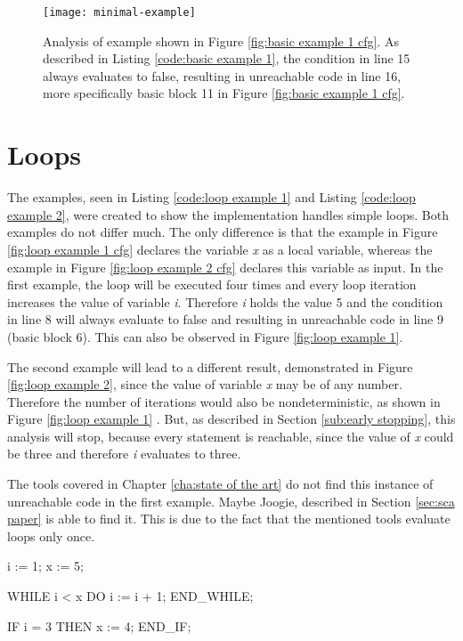 \begin{figure}[h!]
	\centering
	\texttt{[image: minimal-example]}
	\caption{Analysis of example shown in Figure \ref{fig:basic example 1 cfg}. As described in Listing \ref{code:basic example 1}, the condition in line 15 always evaluates to false, resulting in unreachable code in line 16, more specifically basic block 11 in Figure \ref{fig:basic example 1 cfg}. }
	\label{fig:basic example 1}
\end{figure}

\section{Loops}
\label{sec:loops}
The examples, seen in Listing \ref{code:loop example 1} and Listing \ref{code:loop example 2}, were created to show the implementation handles simple loops. Both examples do not differ much. The only difference is that the example in Figure \ref{fig:loop example 1 cfg} declares the variable \emph{x} as a local variable, whereas the example in Figure \ref{fig:loop example 2 cfg} declares this variable as input. 
In the first example, the loop will be executed four times and every loop iteration increases the value of variable \emph{i}. Therefore \emph{i} holds the value 5 and the condition in line 8 will always evaluate to false and resulting in unreachable code in line 9 (basic block 6). This can also be observed in Figure \ref{fig:loop example 1}.


The second example will lead to a different result, demonstrated in Figure \ref{fig:loop example 2}, since the value of variable \emph{x} may be of any number. Therefore the number of iterations would also be nondeterministic, as shown in Figure \ref{fig:loop example 1} . But, as described in Section \ref{sub:early stopping}, this analysis will stop, because every statement is reachable, since the value of \emph{x} could be three and therefore \emph{i} evaluates to three. 


The tools covered in Chapter \ref{cha:state of the art} do not find this instance of unreachable code in the first example. Maybe Joogie, described in Section \ref{sec:sca paper} is  able to find it. This is due to the fact that the mentioned tools evaluate loops only once.

\begin{program}[h!]
		\begin{GenericCode}
i := 1;
x := 5;
		
WHILE i < x DO
	i := i + 1;
END_WHILE;
		
IF i = 3 THEN
	x := 4;
END_IF;	\end{GenericCode}
\centering
\caption{A simple loop that increments a number. Since \emph{i} is dependent on the iterations, which are limited by and will be equal to \emph{x}, in this case 5, the condition in line 8 will never evaluate true.}
\label{code:loop example 1}
\end{program}

